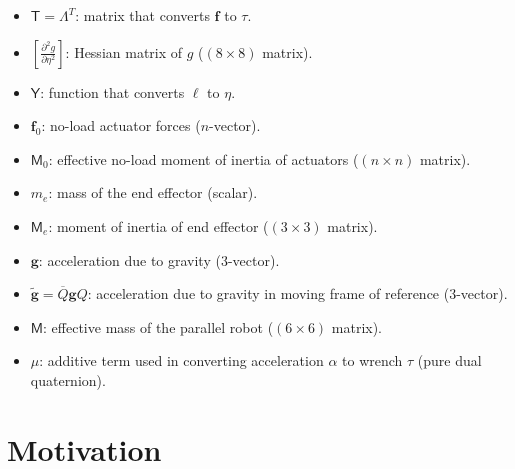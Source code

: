 \documentclass[reqno,12pt]{amsart}
\begin{document}
\begin{itemize}
\item $\mathsf T = \mathsf\Lambda^T$: matrix that converts $\bm f$ to $\tau$.
\item $\left[\frac{\partial^2g}{\partial\eta^2}\right]$: Hessian matrix of $g$ ($(8 \times 8)$ matrix).
\item $\mathsf Y$: function that converts $\bm\ell$ to $\eta$.
\item $\bm f_0$: no-load actuator forces ($n$-vector).
\item $\mathsf M_0$: effective no-load moment of inertia of actuators ($(n\times n)$ matrix).
\item $m_e$: mass of the end effector (scalar).
\item $\mathsf M_e$: moment of inertia of end effector ($(3\times3)$ matrix).
\item $\bm g$: acceleration due to gravity (3-vector).
\item $\tilde{\bm g} = \overline Q \bm g Q$: acceleration due to gravity in moving frame of reference (3-vector).
\item $\mathsf M$: effective mass of the parallel robot ($(6\times6)$ matrix).
\item $\mu$: additive term used in converting acceleration $\alpha$ to wrench $\tau$ (pure dual quaternion).
\end{itemize}

\section{Motivation}
\label{sec motivation}
\end{document}
